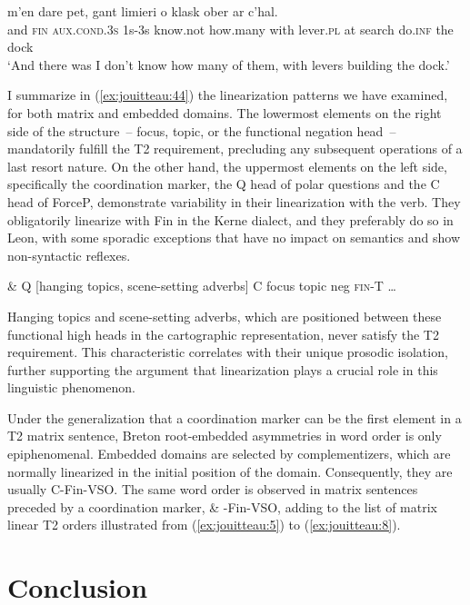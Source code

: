\documentclass[output=paper,colorlinks,citecolor=brown]{langscibook}
\begin{document}
    \gll {} {}    {}                  m’en dare     pet,           gant  limieri  o   klask    ober   ar c’hal. \\
     and  \textsc{fin} \textsc{aux.cond.3s}  1s-3s know.not how.many with lever\textsc{.pl}  at  search  do\textsc{.inf}  the dock    \\
    \glt `And there was I don’t know how many of them, with levers building the dock.’ 
    \z 


I summarize in (\ref{ex:jouitteau:44}) the linearization patterns we have examined, for both matrix and embedded domains. The lowermost elements on the right side of the structure~-- focus, topic, or the functional negation head~-- mandatorily fulfill the T2 requirement, precluding any subsequent operations of a last resort nature. On the other hand, the uppermost elements on the left side, specifically the coordination marker, the Q head of polar questions and the C head of ForceP, demonstrate variability in their linearization with the verb. They obligatorily linearize with Fin in the Kerne dialect, and they preferably do so in Leon, with some sporadic exceptions that have no impact on semantics and show non-syntactic reflexes. 


\ea \label{ex:jouitteau:44} \& Q [hanging topics, scene-setting adverbs] C focus topic neg  \textsc{fin}-T …
\z 

\noindent Hanging topics and scene-setting adverbs, which are positioned between these functional high heads in the cartographic representation, never satisfy the T2 requirement. This characteristic correlates with their unique prosodic isolation, further supporting the argument that linearization plays a crucial role in this linguistic phenomenon. 

Under the generalization that a coordination marker can be the first element in a T2 matrix sentence, Breton root-embedded asymmetries in word order is only epiphenomenal. Embedded domains are selected by complementizers, which are normally linearized in the initial position of the domain. Consequently, they are usually C-Fin-VSO. The same word order is observed in matrix sentences preceded by a coordination marker, \& -Fin-VSO, adding to the list of matrix linear T2 orders illustrated from (\ref{ex:jouitteau:5}) to (\ref{ex:jouitteau:8}). 

\section{Conclusion}\label{sec:jouitteau:6}
\end{document}
